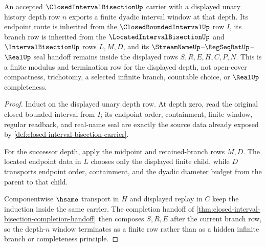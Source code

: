 \begin{theorem}
\label{thm:closed-interval-bisection-interval-modulus-termination}
An accepted $\ClosedIntervalBisectionUp$ carrier with a displayed unary history depth row $n$ exports a finite dyadic interval window at that depth. Its endpoint route is inherited from the $\ClosedBoundedIntervalUp$ row $I$, its branch row is inherited from the $\LocatedIntervalBisectionUp$ and $\IntervalBisectionUp$ rows $L,M,D$, and its $\StreamNameUp$--$\RegSeqRatUp$--$\RealUp$ seal handoff remains inside the displayed rows $S,R,E,H,C,P,N$. This is a finite modulus and termination row for the displayed depth, not open-cover compactness, trichotomy, a selected infinite branch, countable choice, or $\RealUp$ completeness.
\end{theorem}
\begin{proof}
Induct on the displayed unary depth row. At depth zero, read the original closed bounded interval from $I$; its endpoint order, containment, finite window, regular readback, and real-name seal are exactly the source data already exposed by \autoref{def:closed-interval-bisection-carrier}.

For the successor depth, apply the midpoint and retained-branch rows $M,D$. The located endpoint data in $L$ chooses only the displayed finite child, while $D$ transports endpoint order, containment, and the dyadic diameter budget from the parent to that child.

Componentwise $\hsame$ transport in $H$ and displayed replay in $C$ keep the induction inside the same carrier. The completion handoff of \autoref{thm:closed-interval-bisection-completion-handoff} then composes $S,R,E$ after the current branch row, so the depth-$n$ window terminates as a finite row rather than as a hidden infinite branch or completeness principle.
\end{proof}

